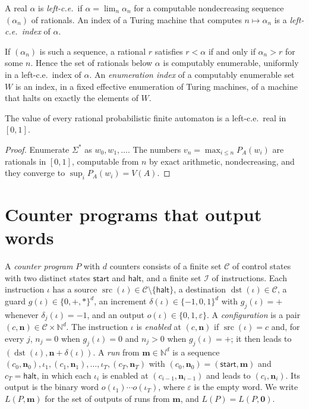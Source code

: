 \documentclass[11pt]{article}
\theoremstyle{plain}
\theoremstyle{definition}
\theoremstyle{remark}
\newcommand{\N}{\mathbb N}
\newcommand{\eps}{\varepsilon}
\newcommand{\start}{\mathsf{start}}
\newcommand{\halt}{\mathsf{halt}}
\newcommand{\src}{\operatorname{src}}
\newcommand{\dst}{\operatorname{dst}}
\newcommand{\cS}{\mathcal C}
\newcommand{\cI}{\mathcal I}
\begin{document}
\begin{definition}
A real $\alpha$ is \emph{left-c.e.}\ if $\alpha=\lim_n\alpha_n$ for a computable nondecreasing sequence $(\alpha_n)$ of rationals. An index of a Turing machine that computes $n\mapsto\alpha_n$ is a \emph{left-c.e.\ index} of $\alpha$.
\end{definition}

If $(\alpha_n)$ is such a sequence, a rational $r$ satisfies $r<\alpha$ if and only if $\alpha_n>r$ for some $n$. Hence the set of rationals below $\alpha$ is computably enumerable, uniformly in a left-c.e.\ index of $\alpha$. An \emph{enumeration index} of a computably enumerable set $W$ is an index, in a fixed effective enumeration of Turing machines, of a machine that halts on exactly the elements of $W$.

\begin{proposition}[folklore]\label{prop:easy}
The value of every rational probabilistic finite automaton is a left-c.e.\ real in $[0,1]$.
\end{proposition}

\begin{proof}
Enumerate $\Sigma^*$ as $w_0,w_1,\dots$. The numbers $v_n=\max_{i\le n}P_A(w_i)$ are rationals in $[0,1]$, computable from $n$ by exact arithmetic, nondecreasing, and they converge to $\sup_iP_A(w_i)=V(A)$.
\end{proof}

\section{Counter programs that output words}\label{sec:counter}

\begin{definition}\label{def:program}
A \emph{counter program} $P$ with $d$ counters consists of a finite set $\cS$ of control states with two distinct states $\start$ and $\halt$, and a finite set $\cI$ of instructions. Each instruction $\iota$ has a source $\src(\iota)\in\cS\setminus\{\halt\}$, a destination $\dst(\iota)\in\cS$, a guard $g(\iota)\in\{0,+,*\}^d$, an increment $\delta(\iota)\in\{-1,0,1\}^d$ with $g_j(\iota)={+}$ whenever $\delta_j(\iota)=-1$, and an output $o(\iota)\in\{0,1,\eps\}$. A \emph{configuration} is a pair $(c,\mathbf n)\in\cS\times\N^d$. The instruction $\iota$ is \emph{enabled} at $(c,\mathbf n)$ if $\src(\iota)=c$ and, for every $j$, $n_j=0$ when $g_j(\iota)=0$ and $n_j>0$ when $g_j(\iota)={+}$; it then leads to $(\dst(\iota),\mathbf n+\delta(\iota))$. A \emph{run} from $\mathbf m\in\N^d$ is a sequence $(c_0,\mathbf n_0),\iota_1,(c_1,\mathbf n_1),\dots,\iota_T,(c_T,\mathbf n_T)$ with $(c_0,\mathbf n_0)=(\start,\mathbf m)$ and $c_T=\halt$, in which each $\iota_i$ is enabled at $(c_{i-1},\mathbf n_{i-1})$ and leads to $(c_i,\mathbf n_i)$. Its output is the binary word $o(\iota_1)\cdots o(\iota_T)$, where $\eps$ is the empty word. We write $L(P,\mathbf m)$ for the set of outputs of runs from $\mathbf m$, and $L(P)=L(P,\mathbf 0)$.
\end{definition}
\end{document}
